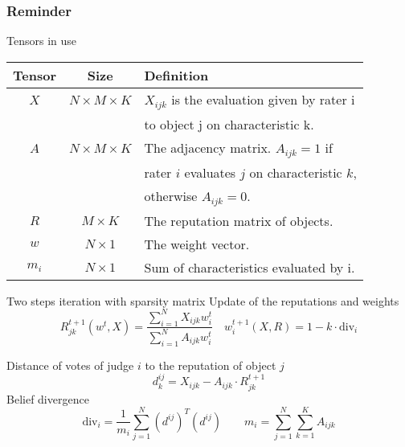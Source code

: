 
\begin{frame}[allowframebreaks]
\frametitle{Reminder}
\begin{block}{Tensors in use}
\centering
\begin{tabular}{@{}ccl@{}}
\hline
Tensor & Size                  & Definition                                                                                                     \\ \hline
$X$    & $N \times M \times K$ & $X_{ijk}$ is the evaluation given by rater i\\
          &                                     &  to object j on characteristic k. \\
$A$    & $N \times M \times K$ & The adjacency matrix. $A_{ijk} = 1$ if \\
          &                                & rater $i$ evaluates $j$ on characteristic $k$, \\
          &                                & otherwise $A_{ijk} = 0$. \\
$R$    & $M \times K$          & The reputation matrix of objects. \\
$w$    & $N \times 1$          & The weight vector.     \\
$m_i$ & $N \times 1$          & Sum of characteristics evaluated by i. \\                                                                                      
\end{tabular}
\end{block}

\framebreak

    \begin{block}{Two steps iteration with sparsity matrix}
    Update of the reputations and weights
        \[
            R_{jk}^{t+1}(w^t,X) = \frac{\sum_{i=1}^N X_{ijk}w^t_{i}}{\sum_{i=1}^{N} A_{ijk} w^t_{i}} \quad 
        	w_i^{t+1}(X,R) = 1 -k \cdot \mathrm{div}_i \]

    \end{block}
    
    
    \begin{block}{}
    Distance of votes of judge $i$ to the reputation of object $j$
    \[d^{ij}_k= X_{ijk}-A_{ijk}\cdot R^{t+1}_{jk} \]
    Belief divergence
    \[ \mathrm{div}_i =  \frac{1}{m_i}\sum_{j=1}^N (d^{ij})^T (d^{ij}) \qquad m_i = \sum_{j=1}^{N} \sum_{k=1}^{K} A_{ijk} \]
    \end{block}
\end{frame}

